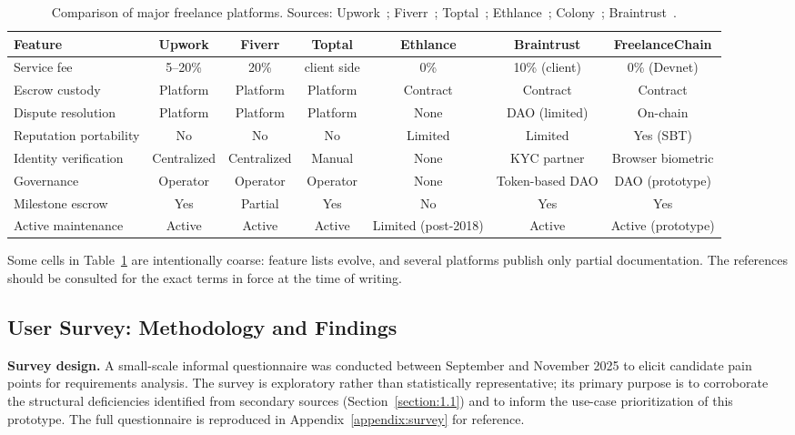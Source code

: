 \begin{table}[H]
\centering
\caption{Comparison of major freelance platforms. Sources: Upwork~\cite{upworkfees2024,upwork2023}; Fiverr~\cite{fiverrfees2024,fiverr2023}; Toptal~\cite{toptal2024policy}; Ethlance~\cite{ethlance2018}; Colony~\cite{colony2020whitepaper}; Braintrust~\cite{braintrust2021whitepaper}.}
\label{table:platform_comparison}
\small
\begin{tabular}{|l|c|c|c|c|c|c|}
\hline
\textbf{Feature} & \textbf{Upwork} & \textbf{Fiverr} & \textbf{Toptal} & \textbf{Ethlance} & \textbf{Braintrust} & \textbf{FreelanceChain} \\ \hline
Service fee & 5--20\% & 20\% & client side & 0\% & 10\% (client) & 0\% (Devnet) \\ \hline
Escrow custody & Platform & Platform & Platform & Contract & Contract & Contract \\ \hline
Dispute resolution & Platform & Platform & Platform & None & DAO (limited) & On-chain \\ \hline
Reputation portability & No & No & No & Limited & Limited & Yes (SBT) \\ \hline
Identity verification & Centralized & Centralized & Manual & None & KYC partner & Browser biometric \\ \hline
Governance & Operator & Operator & Operator & None & Token-based DAO & DAO (prototype) \\ \hline
Milestone escrow & Yes & Partial & Yes & No & Yes & Yes \\ \hline
Active maintenance & Active & Active & Active & Limited (post-2018) & Active & Active (prototype) \\ \hline
\end{tabular}
\end{table}

\noindent Some cells in Table~\ref{table:platform_comparison} are intentionally coarse: feature lists evolve, and several platforms publish only partial documentation. The references should be consulted for the exact terms in force at the time of writing.

\subsection{User Survey: Methodology and Findings}
\label{subsection:2.1.2}

\textbf{Survey design.} A small-scale informal questionnaire was conducted between September and November 2025 to elicit candidate pain points for requirements analysis. The survey is exploratory rather than statistically representative; its primary purpose is to corroborate the structural deficiencies identified from secondary sources (Section~\ref{section:1.1}) and to inform the use-case prioritization of this prototype. The full questionnaire is reproduced in Appendix~\ref{appendix:survey} for reference.


